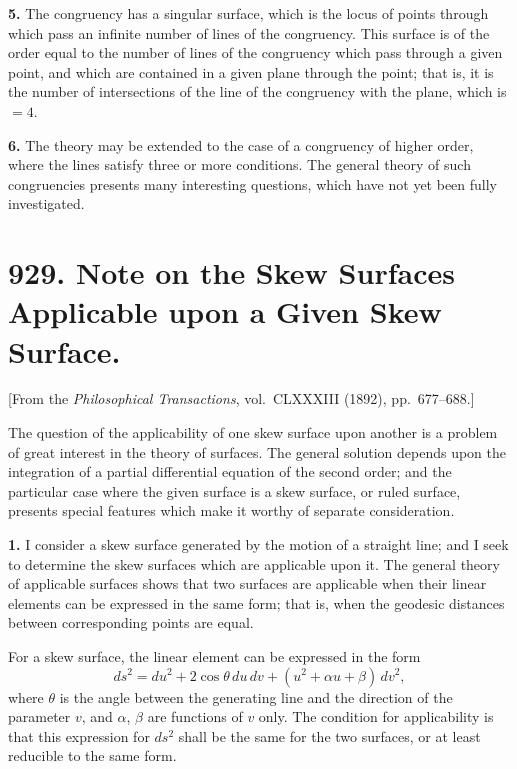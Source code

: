 \documentclass[11pt,a4paper]{book}
\begin{document}
{{{\textbf{5.} The congruency has a singular surface, which is the locus of points
through which pass an infinite number of lines of the congruency. This surface
is of the order equal to the number of lines of the congruency which pass through
a given point, and which are contained in a given plane through the point; that is,
it is the number of intersections of the line of the congruency with the plane, which
is $= 4$.

\textbf{6.} The theory may be extended to the case of a congruency of higher
order, where the lines satisfy three or more conditions. The general theory of such
congruencies presents many interesting questions, which have not yet been fully
investigated.



\newpage
\section*{929. Note on the Skew Surfaces Applicable upon a Given Skew Surface.}

[From the \textit{Philosophical Transactions}, vol.~CLXXXIII (1892), pp.~677--688.]

\bigskip

The question of the applicability of one skew surface upon another is a
problem of great interest in the theory of surfaces. The general solution depends
upon the integration of a partial differential equation of the second order; and the
particular case where the given surface is a skew surface, or ruled surface, presents
special features which make it worthy of separate consideration.

\textbf{1.} I consider a skew surface generated by the motion of a straight line;
and I seek to determine the skew surfaces which are applicable upon it. The
general theory of applicable surfaces shows that two surfaces are applicable when
their linear elements can be expressed in the same form; that is, when the
geodesic distances between corresponding points are equal.

For a skew surface, the linear element can be expressed in the form
\[
ds^2 = du^2 + 2\cos\theta\,du\,dv + (u^2 + \alpha u + \beta)\,dv^2,
\]
where $\theta$ is the angle between the generating line and the direction of the parameter
$v$, and $\alpha$, $\beta$ are functions of $v$ only. The condition for applicability is that this
expression for $ds^2$ shall be the same for the two surfaces, or at least reducible to
the same form.

}}}
\end{document}
